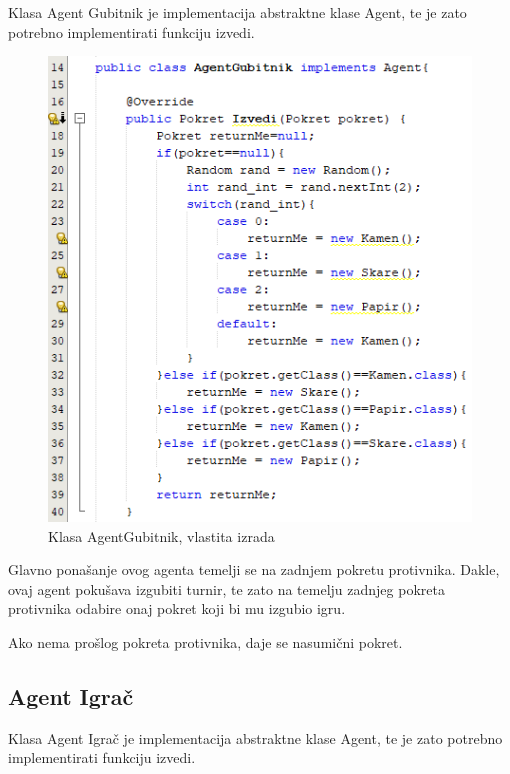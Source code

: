 \documentclass{foi}
\begin{document}
Klasa Agent Gubitnik je implementacija abstraktne klase Agent, te je zato potrebno implementirati funkciju izvedi.

\begin{figure}[h!]
    \centering
    \includegraphics[scale=0.9]{slike/Screenshot_5.png}
    \caption{Klasa AgentGubitnik, vlastita izrada}
\end{figure}

Glavno ponašanje ovog agenta temelji se na zadnjem pokretu protivnika. Dakle, ovaj agent pokušava izgubiti turnir, te zato na temelju zadnjeg pokreta protivnika odabire onaj pokret koji bi mu izgubio igru.

Ako nema prošlog pokreta protivnika, daje se nasumični pokret.

\clearpage

\subsection{Agent Igrač}

Klasa Agent Igrač je implementacija abstraktne klase Agent, te je zato potrebno implementirati funkciju izvedi.
\end{document}
